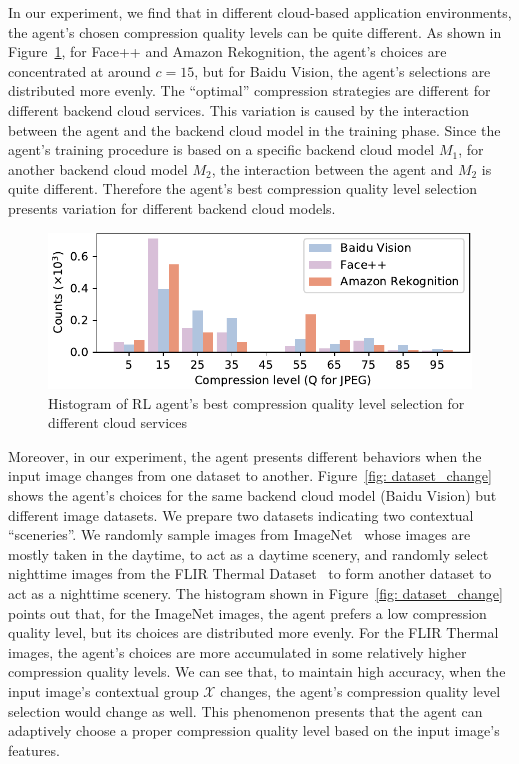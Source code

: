 In our experiment, we find that in different cloud-based application environments, the agent's chosen compression quality levels can be quite different. As shown in Figure~\ref{fig: quality_chosen}, for Face++ and Amazon Rekognition, the agent's choices are concentrated at around $ c=15 $, but for Baidu Vision, the agent's selections are distributed more evenly. The ``optimal'' compression strategies are different for different backend cloud services. This variation is caused by the interaction between the agent and the backend cloud model in the training phase. Since the agent's training procedure is based on a specific backend cloud model $ M_1 $, for another backend cloud model $ M_2 $, the interaction between the agent and $ M_2 $ is quite different. Therefore the agent's best compression quality level selection presents variation for different backend cloud models.  

\begin{figure}[htbp]
	\includegraphics[width=\linewidth]{figures/quality_chosen.pdf}
	\caption{Histogram of RL agent's best compression quality level selection for different cloud services}
	\label{fig: quality_chosen}
\end{figure}

Moreover, in our experiment, the agent presents different behaviors when the input image changes from one dataset to another. Figure~\ref{fig: dataset_change} shows the agent's choices for the same backend cloud model (Baidu Vision) but different image datasets. We prepare two datasets indicating two contextual ``sceneries''. We randomly sample images from ImageNet~\cite{ImageNet} whose images are mostly taken in the daytime, to act as a daytime scenery, and randomly select nighttime images from the FLIR Thermal Dataset~\cite{FLIR} to form another dataset to act as a nighttime scenery. The histogram shown in Figure~\ref{fig: dataset_change} points out that, for the ImageNet images, the agent prefers a low compression quality level, but its choices are distributed more evenly. For the FLIR Thermal images, the agent's choices are more accumulated in some relatively higher compression quality levels. We can see that, to maintain high accuracy, when the input image's contextual group $ \mathcal{X} $ changes, the agent's compression quality level selection would change as well. This phenomenon presents that the agent can adaptively choose a proper compression quality level based on the input image's features. %

